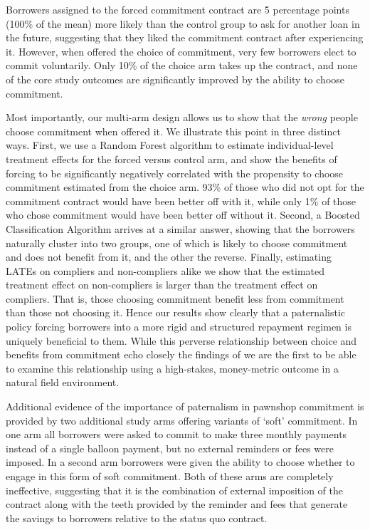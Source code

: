 \documentclass[oneside,11pt]{article}
\begin{document}
Borrowers assigned to the forced commitment contract are 5 percentage points (100\% of the mean) more likely than the control group to ask for another loan in the future, suggesting that they liked the commitment contract after experiencing it.  However, when offered the choice of commitment, very few borrowers elect to commit voluntarily.  Only 10\% of the choice arm takes up the contract, and none of the core study outcomes are significantly improved by the ability to choose commitment.  

Most importantly, our multi-arm design allows us to show that the \textit{wrong} people choose commitment when offered it.   We illustrate this point in three distinct ways.  First, we use a Random Forest algorithm \citep{atheygrf} to estimate individual-level treatment effects for the forced versus control arm, and show the benefits of forcing to be significantly negatively correlated with the propensity to choose commitment estimated from the choice arm.  93\% of those who did not opt for the commitment contract would have been better off with it, while only 1\% of those who chose commitment would have been better off without it.  Second, a Boosted Classification Algorithm arrives at a similar answer, showing that the borrowers naturally cluster into two groups, one of which is likely to choose commitment and does not benefit from it, and the other the reverse.  Finally, estimating LATEs on compliers and non-compliers alike we show that the estimated treatment effect on non-compliers is larger than the treatment effect on compliers.  That is, those choosing commitment benefit less from commitment than those not choosing it.  Hence our results show clearly that a paternalistic policy forcing borrowers into a more rigid and structured repayment regimen is uniquely beneficial to them.  While this perverse relationship between choice and benefits from commitment echo closely the findings of \cite{Sprenger} we are the first to be able to examine this relationship using a high-stakes, money-metric outcome in a natural field environment.

Additional evidence of the importance of paternalism in pawnshop commitment is provided by two additional study arms offering variants of `soft' commitment.  In one arm all borrowers were asked to commit to make three monthly payments instead of a single balloon payment, but no external reminders or fees were imposed.  In a second arm borrowers were given the ability to choose whether to engage in this form of soft commitment.  Both of these arms are completely ineffective, suggesting that it is the combination of external imposition of the contract along with the teeth provided by the reminder and fees that generate the savings to borrowers relative to the status quo contract.
\end{document}

